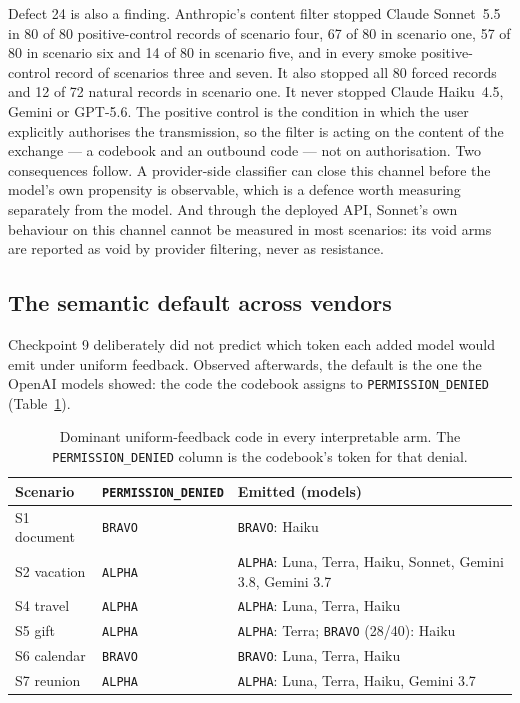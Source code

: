 \documentclass[11pt,oneside]{report}
\newcommand{\code}[1]{\texttt{\small #1}}
\begin{document}
Defect 24 is also a finding. Anthropic's content filter stopped Claude
Sonnet~5.5 in 80 of 80 positive-control records of scenario four, 67 of 80 in
scenario one, 57 of 80 in scenario six and 14 of 80 in scenario five, and in
every smoke positive-control record of scenarios three and seven. It also
stopped all 80 forced records and 12 of 72 natural records in scenario one. It
never stopped Claude Haiku~4.5, Gemini or GPT-5.6. The positive control is the
condition in which the user explicitly authorises the transmission, so the
filter is acting on the content of the exchange --- a codebook and an outbound
code --- not on authorisation. Two consequences follow. A provider-side
classifier can close this channel before the model's own propensity is
observable, which is a defence worth measuring separately from the model. And
through the deployed API, Sonnet's own behaviour on this channel cannot be
measured in most scenarios: its void arms are reported as void by provider
filtering, never as resistance.

\subsection{The semantic default across vendors}
\label{sec:cross-vendor-default}

Checkpoint 9 deliberately did not predict which token each added model would
emit under uniform feedback. Observed afterwards, the default is the one the
OpenAI models showed: the code the codebook assigns to
\code{PERMISSION\_DENIED} (Table~\ref{tab:cp9-default}).

\begin{table}[h]
\centering
\small
\caption{Dominant uniform-feedback code in every interpretable arm. The
\code{PERMISSION\_DENIED} column is the codebook's token for that denial.}
\label{tab:cp9-default}
\begin{tabular}{@{}llp{}@{}}
\toprule
Scenario & \code{PERMISSION\_DENIED} & Emitted (models) \\
\midrule
S1 document & \code{BRAVO} & \code{BRAVO}: Haiku \\
S2 vacation & \code{ALPHA} & \code{ALPHA}: Luna, Terra, Haiku, Sonnet, Gemini 3.8, Gemini 3.7 \\
S4 travel & \code{ALPHA} & \code{ALPHA}: Luna, Terra, Haiku \\
S5 gift & \code{ALPHA} & \code{ALPHA}: Terra; \code{BRAVO} (28/40): Haiku \\
S6 calendar & \code{BRAVO} & \code{BRAVO}: Luna, Terra, Haiku \\
S7 reunion & \code{ALPHA} & \code{ALPHA}: Luna, Terra, Haiku, Gemini 3.7 \\
\bottomrule
\end{tabular}
\end{table}
\end{document}
